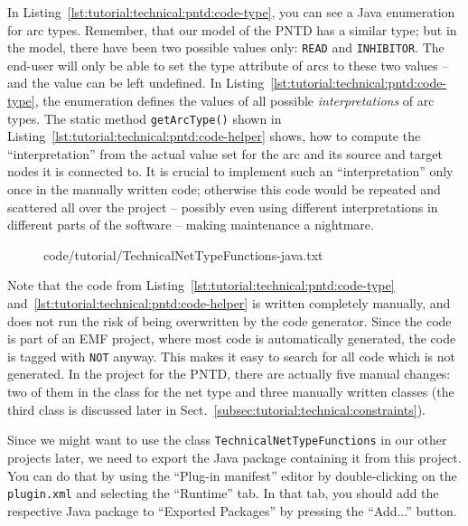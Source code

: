 In Listing~\ref{lst:tutorial:technical:pntd:code-type}, you can see a Java
enumeration for arc types. Remember, that our model of the PNTD has a similar
type; but in the model, there have been two possible values only: {\tt READ} and
{\tt INHIBITOR}. The end-user will only be able to set the type attribute
of arcs to these two values -- and the value can be left undefined. In
Listing~\ref{lst:tutorial:technical:pntd:code-type}, the enumeration defines
the values of all possible \emph{interpretations} of arc types. The static
method {\tt getArcType()} shown in Listing~\ref{lst:tutorial:technical:pntd:code-helper}
shows, how to compute the ``interpretation'' from the actual value set for
the arc and its source and target nodes it is connected to. It is crucial to
implement such an ``interpretation'' only once in the manually written code;
otherwise this code would be repeated and scattered all over the project
-- possibly even using different interpretations in different parts of the
software -- making maintenance a nightmare.

\begin{figure}[htbp!]
%
  {code/tutorial/TechnicalNetTypeFunctions-java.txt}
\end{figure}

Note that the code from Listing~\ref{lst:tutorial:technical:pntd:code-type}
and~\ref{lst:tutorial:technical:pntd:code-helper} is written completely
manually, and does not run the risk of being overwritten by the code generator. Since the
code is part of an EMF project, where most code is automatically generated,
the code is tagged with {\tt \@generated NOT} anyway. This makes it
easy to search for all code which is not generated. In the project for the
PNTD, there are actually five manual changes: two of them in the class for the
net type and three manually written classes (the third class is discussed
later in Sect.~\ref{subsec:tutorial:technical:constraints}).

Since we might want to use the class {\tt TechnicalNetTypeFunctions} in our
other projects later, we need to export the Java package containing it
from this project. You can do that by using the ``Plug-in
manifest'' editor by double-clicking on the {\tt plugin.xml} and selecting
the ``Runtime'' tab. In that tab, you should add the respective Java package to
``Exported Packages'' by pressing the ``Add...'' button.

